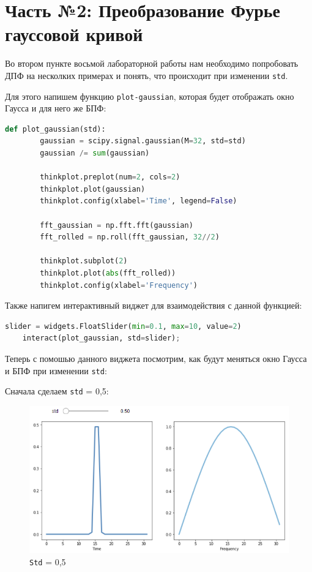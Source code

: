 \documentclass[a4paper]{article}
\begin{document}
    \newpage
        \section{Часть №2: Преобразование Фурье гауссовой кривой}
            Во втором пункте восьмой лабораторной работы нам необходимо попробовать ДПФ на несколких примерах и понять, что происходит при изменении \texttt{std}.
            
            Для этого напишем функцию \texttt{plot-gaussian}, которая будет отображать окно Гаусса и для него же БПФ:
            
\begin{lstlisting}[language=Python, caption= Функция \texttt{plot-gaussian}]
    def plot_gaussian(std):
        gaussian = scipy.signal.gaussian(M=32, std=std)
        gaussian /= sum(gaussian)
        
        thinkplot.preplot(num=2, cols=2)
        thinkplot.plot(gaussian)
        thinkplot.config(xlabel='Time', legend=False)
    
        fft_gaussian = np.fft.fft(gaussian)
        fft_rolled = np.roll(fft_gaussian, 32//2)
        
        thinkplot.subplot(2)
        thinkplot.plot(abs(fft_rolled))
        thinkplot.config(xlabel='Frequency')
\end{lstlisting}
            
            Также напигем интерактивный виджет для взаимодействия с данной функцией:
            
\begin{lstlisting}[language=Python, caption= Интерактивный виджет для функции \texttt{plot-gaussian}]
    slider = widgets.FloatSlider(min=0.1, max=10, value=2)
    interact(plot_gaussian, std=slider);
\end{lstlisting}
            
            Теперь с помошью данного виджета посмотрим, как будут меняться окно Гаусса и БПФ при изменении \texttt{std}:
            
            Сначала сделаем \texttt{std} = 0,5:
            
            \begin{figure}[H]
                \centering
                \includegraphics[width=\textwidth]{ex_2_std_0_5.png}
                \caption{\texttt{Std} = 0,5}
                \label{fig:ex_2_std_0_5}
            \end{figure}
            
\end{document}
